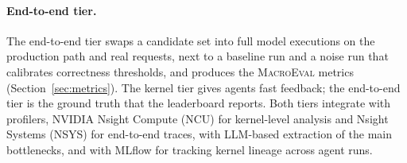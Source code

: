 \paragraph{End-to-end tier.}
The end-to-end tier swaps a candidate set into full model executions on the production path and real requests, next to a baseline run and a noise run that calibrates correctness thresholds, and produces the \textsc{MacroEval} metrics (Section~\ref{sec:metrics}).
The kernel tier gives agents fast feedback; the end-to-end tier is the ground truth that the leaderboard reports.
Both tiers integrate with profilers, NVIDIA Nsight Compute (NCU) for kernel-level analysis and Nsight Systems (NSYS) for end-to-end traces, with LLM-based extraction of the main bottlenecks, and with MLflow for tracking kernel lineage across agent runs.
